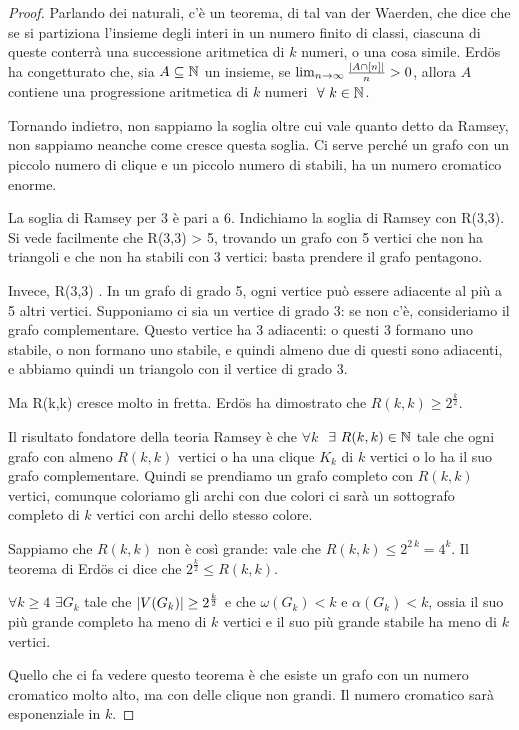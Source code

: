 \begin{proof}
	Parlando dei naturali, c'\`e un teorema, di tal van der Waerden, che dice che se si partiziona l'insieme degli interi in un numero finito di classi, ciascuna di queste conterr\`a una successione aritmetica di $k$ numeri, o una cosa simile.
	Erd\"os ha congetturato che, sia $A \subseteq \mathbb{N}$ un insieme, se $\lim_{n \to \infty} \frac{\left\lvert{A \cap [n]}\right\rvert}{n} > 0$, allora $A$ contiene una progressione aritmetica di $k$ numeri $\forall k \in \naturals$.

	Tornando indietro, non sappiamo la soglia oltre cui vale quanto detto da Ramsey, non sappiamo neanche come cresce questa soglia.
	Ci serve perch\'e un grafo con un piccolo numero di clique e un piccolo numero di stabili, ha un numero cromatico enorme.

	La soglia di Ramsey per 3 \`e pari a 6.
	Indichiamo la soglia di Ramsey con R(3,3).
	Si vede facilmente che R(3,3) > 5, trovando un grafo con 5 vertici che non ha triangoli e che non ha stabili con 3 vertici: basta prendere il grafo pentagono.

	Invece, R(3,3) .
	In un grafo di grado 5, ogni vertice pu\`o essere adiacente al pi\`u a 5 altri vertici.
	Supponiamo ci sia un vertice di grado 3: se non c'\`e, consideriamo il grafo complementare.
	Questo vertice ha 3 adiacenti: o questi 3 formano uno stabile, o non formano uno stabile, e quindi almeno due di questi sono adiacenti, e abbiamo quindi un triangolo con il vertice di grado 3.

	Ma R(k,k) cresce molto in fretta.
	Erd\"os ha dimostrato che $R(k,k) \ge 2^{\frac{k}{2}}$.

	Il risultato fondatore della teoria Ramsey \`e che $\forall k$ $\exists R(k,k) \in \naturals$ tale che ogni grafo con almeno $R(k,k)$ vertici o ha una clique $K_k$ di $k$ vertici o lo ha il suo grafo complementare.
	Quindi se prendiamo un grafo completo con $R(k,k)$ vertici, comunque coloriamo gli archi con due colori ci sar\`a un sottografo completo di $k$ vertici con archi dello stesso colore.

	Sappiamo che $R(k,k)$ non \`e cos\`i grande: vale che $R(k,k) \le 2^{2 \, k} = 4^k$.
	Il teorema di Erd\"os ci dice che $2^{\frac{k}{2}} \le R(k,k)$.

	\begin{theorem}[di Erd\"os]
		$\forall k \ge 4$ $\exists G_k$ tale che $\left\lvert{V(G_k)}\right\rvert \ge 2^{\frac{k}{2}}$ e che $\omega(G_k) < k$ e $\alpha(G_k) < k$, ossia il suo pi\`u grande completo ha meno di $k$ vertici e il suo pi\`u grande stabile ha meno di $k$ vertici.
	\end{theorem}
	Quello che ci fa vedere questo teorema \`e che esiste un grafo con un numero cromatico molto alto, ma con delle clique non grandi.
	Il numero cromatico sar\`a esponenziale in $k$.


\end{proof}
